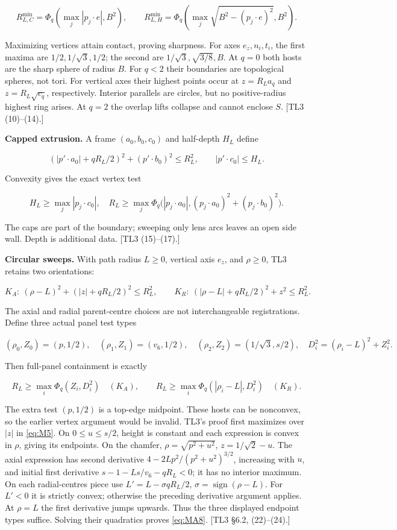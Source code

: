 \documentclass[11pt,a4paper]{article}
\begin{document}
\[
R_{L,C}^{\min}=\Phi_q(\max_j|p_j\cdot e|,B^2),\qquad
R_{L,H}^{\min}=\Phi_q(\max_j\sqrt{B^2-(p_j\cdot e)^2},B^2).
\tag{MA4}\label{eq:MA4}
\]

Maximizing vertices attain contact, proving sharpness. For axes \(e_z,n_i,t_i\), the first maxima are \(1/2,1/\sqrt3,1/2\); the second are \(1/\sqrt3,\sqrt{3/8},B\). At \(q=0\) both hosts are the sharp sphere of radius \(B\). For \(q<2\) their boundaries are topological spheres, not tori. For vertical axes their highest points occur at \(z=R_La_q\) and \(z=R_L\sqrt{c_q}\), respectively. Interior parallels are circles, but no positive-radius highest ring arises. At \(q=2\) the overlap lifts collapse and cannot enclose \(S\). [TL3 (10)--(14).]

\textbf{Capped extrusion.} A frame \((a_0,b_0,c_0)\) and half-depth \(H_L\) define

\[
(|p'\cdot a_0|+qR_L/2)^2+(p'\cdot b_0)^2\le R_L^2,
\qquad |p'\cdot c_0|\le H_L.
\tag{MA5}\label{eq:MA5}
\]

Convexity gives the exact vertex test

\[
H_L\ge\max_j|p_j\cdot c_0|,\quad
R_L\ge\max_j\Phi_q\bigl(|p_j\cdot a_0|,
(p_j\cdot a_0)^2+(p_j\cdot b_0)^2\bigr).
\tag{MA6}\label{eq:MA6}
\]

The caps are part of the boundary; sweeping only lens arcs leaves an open side wall. Depth is additional data. [TL3 (15)--(17).]

\textbf{Circular sweeps.} With path radius \(L\ge0\), vertical axis \(e_z\), and \(\rho\ge0\), TL3 retains two orientations:

\[
K_A:\ (\rho-L)^2+(|z|+qR_L/2)^2\le R_L^2,\qquad
K_R:\ (|\rho-L|+qR_L/2)^2+z^2\le R_L^2.
\tag{MA7}\label{eq:MA7}
\]

The axial and radial parent-centre choices are not interchangeable registrations. Define three actual panel test types

\[
(\rho_0,Z_0)=(p,1/2),\quad(\rho_1,Z_1)=(v_6,1/2),\quad
(\rho_2,Z_2)=(1/\sqrt3,s/2),\quad D_i^2=(\rho_i-L)^2+Z_i^2.
\]

Then full-panel containment is exactly

\[
R_L\ge\max_i\Phi_q(Z_i,D_i^2)\quad(K_A),\qquad
R_L\ge\max_i\Phi_q(|\rho_i-L|,D_i^2)\quad(K_R).
\tag{MA8}\label{eq:MA8}
\]

The extra test \((p,1/2)\) is a top-edge midpoint. These hosts can be nonconvex, so the earlier vertex argument would be invalid. TL3's proof first maximizes over \(|z|\) in \eqref{eq:M5}. On \(0\le u\le s/2\), height is constant and each expression is convex in \(\rho\), giving its endpoints. On the chamfer, \(\rho=\sqrt{p^2+u^2}\), \(z=1/\sqrt2-u\). The axial expression has second derivative \(4-2Lp^2/(p^2+u^2)^{3/2}\), increasing with \(u\), and initial first derivative \(s-1-Ls/v_6-qR_L<0\); it has no interior maximum. On each radial-centres piece use \(L'=L-\sigma qR_L/2\), \(\sigma=\operatorname{sign}(\rho-L)\). For \(L'<0\) it is strictly convex; otherwise the preceding derivative argument applies. At \(\rho=L\) the first derivative jumps upwards. Thus the three displayed endpoint types suffice. Solving their quadratics proves \eqref{eq:MA8}. [TL3 \S{}6.2, (22)--(24).]
\end{document}
